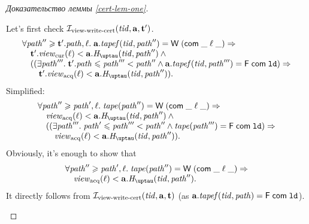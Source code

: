\begin{proof}[Доказательство леммы \ref{cert-lem-one}]
\begin{itemize}
      Let's first check $\mathcal{I}_{\textup{\rm view-write-cert}}(\mathit{tid}, \mathbf{a}, \mathbf{t}')$.
      \[\begin{array}{l}
  \forall \cpath'' \ge \tT'.\cpath, \loc. \; \aT.\tapef(\tId, \cpath'') = \tapeWrite{(\tapeWriteCommitted{\_}{\loc}{\_})} \Rightarrow \\
  \quad \tT'.\Rcur(\loc) < \aT.\tmap(\tId, \cpath'') \land {} \\
  \quad ((\exists \cpath'''. \; \tT'.\cpath \le \cpath''' < \cpath'' \land 
             \aT.\tapef(\tId, \cpath''') = \tapeFence{\Committed}{\LD}) \Rightarrow \\
  \qquad \tT'.\Racq(\loc) < \aT.\tmap(\tId, \cpath'')).\\
      \end{array}\]
      Simplified:
      \[\begin{array}{l}
  \forall \cpath'' \ge \cpath', \loc. \; \tape(\cpath'') = \tapeWrite{(\tapeWriteCommitted{\_}{\loc}{\_})} \Rightarrow \\
  \quad \Racq(\loc) < \aT.\tmap(\tId, \cpath'') \land {} \\
  \quad ((\exists \cpath'''. \; \cpath' \le \cpath''' < \cpath'' \land 
             \tape(\cpath''') = \tapeFence{\Committed}{\LD}) \Rightarrow \\
  \qquad \Racq(\loc) < \aT.\tmap(\tId, \cpath'')).\\
      \end{array}\]
      Obviously, it's enough to show that
      \[\begin{array}{l}
  \forall \cpath'' \ge \cpath', \loc. \; \tape(\cpath'') = \tapeWrite{(\tapeWriteCommitted{\_}{\loc}{\_})} \Rightarrow \\
  \quad \Racq(\loc) < \aT.\tmap(\tId, \cpath'').
      \end{array}\]
      It directly follows from $\mathcal{I}_{\textup{\rm view-write-cert}}(\mathit{tid}, \mathbf{a}, \mathbf{t})$ (as $\mathbf{a}.\mathit{tapef}(\mathit{tid}, \mathit{path}) = \textsf{F} \; \mathsf{com} \; \mathtt{ld}$).


\end{itemize}
\end{proof}
